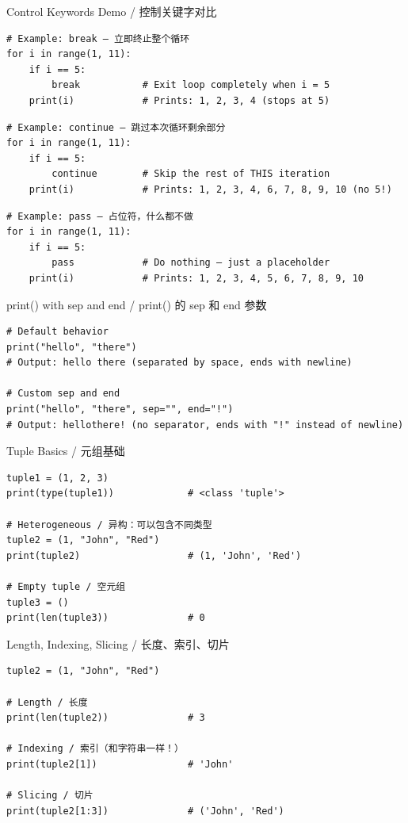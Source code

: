 \documentclass[11pt,a4paper]{report}
\begin{document}
\begin{examplebox}{Control Keywords Demo / 控制关键字对比}
\begin{lstlisting}
# Example: break — 立即终止整个循环
for i in range(1, 11):
    if i == 5:
        break           # Exit loop completely when i = 5
    print(i)            # Prints: 1, 2, 3, 4 (stops at 5)
\end{lstlisting}

\begin{lstlisting}
# Example: continue — 跳过本次循环剩余部分
for i in range(1, 11):
    if i == 5:
        continue        # Skip the rest of THIS iteration
    print(i)            # Prints: 1, 2, 3, 4, 6, 7, 8, 9, 10 (no 5!)
\end{lstlisting}

\begin{lstlisting}
# Example: pass — 占位符，什么都不做
for i in range(1, 11):
    if i == 5:
        pass            # Do nothing — just a placeholder
    print(i)            # Prints: 1, 2, 3, 4, 5, 6, 7, 8, 9, 10
\end{lstlisting}
\end{examplebox}

\begin{examplebox}{print() with sep and end / print() 的 sep 和 end 参数}
\begin{lstlisting}
# Default behavior
print("hello", "there")
# Output: hello there (separated by space, ends with newline)

# Custom sep and end
print("hello", "there", sep="", end="!")
# Output: hellothere! (no separator, ends with "!" instead of newline)
\end{lstlisting}
\end{examplebox}

\begin{examplebox}{Tuple Basics / 元组基础}
\begin{lstlisting}
tuple1 = (1, 2, 3)
print(type(tuple1))             # <class 'tuple'>

# Heterogeneous / 异构：可以包含不同类型
tuple2 = (1, "John", "Red")
print(tuple2)                   # (1, 'John', 'Red')

# Empty tuple / 空元组
tuple3 = ()
print(len(tuple3))              # 0
\end{lstlisting}
\end{examplebox}

\begin{examplebox}{Length, Indexing, Slicing / 长度、索引、切片}
\begin{lstlisting}
tuple2 = (1, "John", "Red")

# Length / 长度
print(len(tuple2))              # 3

# Indexing / 索引（和字符串一样！）
print(tuple2[1])                # 'John'

# Slicing / 切片
print(tuple2[1:3])              # ('John', 'Red')
\end{lstlisting}
\end{examplebox}
\end{document}
